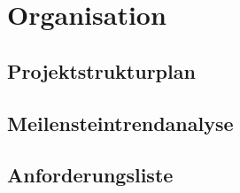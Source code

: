 \chapter{Organisation}

\section{Projektstrukturplan}
\section{Meilensteintrendanalyse}
\section{Anforderungsliste}